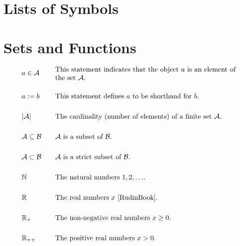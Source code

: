 
\section*{Lists of Symbols}

\vspace*{-2mm}
\section*{Sets and Functions} 

\begin{align} 
	&a \in \mathcal{A} & \quad & \parbox{.75\textwidth}{This statement indicates that the object $a$ is an element of the set $\mathcal{A}$.} \nonumber \\[5mm]
	&a \defeq b & \quad & \mbox{This statement defines $a$ to be shorthand for $b$. } \nonumber \\[5mm]
	&|\mathcal{A}| & \quad & \mbox{The cardinality (number of elements) of a finite set $\mathcal{A}$.} \nonumber \\[5mm]
	&\mathcal{A} \subseteq \mathcal{B}& \quad & \mbox{$\mathcal{A}$ is a subset of $\mathcal{B}$.} \nonumber \\[5mm]
	&\mathcal{A} \subset \mathcal{B}& \quad & \mbox{$\mathcal{A}$ is a strict subset of $\mathcal{B}$.} \nonumber \\[5mm]
	&\mathbb{N} & \quad & \mbox{The natural numbers $1,2,\ldots$.} \nonumber \\[5mm]
	&\mathbb{R}  &\quad &\mbox{The real numbers $x$ \cite{RudinBook}.} \nonumber \\[5mm]
	&\mathbb{R}_{+}  &\quad &\mbox{The non-negative real numbers $x\geq0$.} \nonumber \\[5mm]
	&\mathbb{R}_{++}  &\quad &\mbox{The positive real numbers $x> 0$.} \nonumber
\end{align} 

